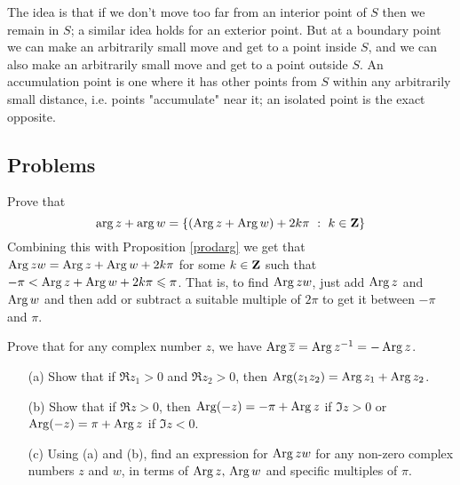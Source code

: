 
\begin{remark}
The idea is that if we don't move too far from an interior point of $S$ then we remain in $S$; a similar idea holds for an exterior point. But at a boundary point we can make an arbitrarily small move and get to a point inside $S$, and we can also make an arbitrarily small move and get to a point outside $S$. An accumulation point is one where it has other points from $S$ within any arbitrarily small distance, i.e. points "accumulate" near it; an isolated point is the exact opposite.
\end{remark}

\vspace*{2em}

\subsection{Problems}
\vspace*{0.1in}

\begin{problem}\label{prob 3.1}
Prove that 
\[\arg z + \arg w = \left\{(\operatorname{Arg} z + \operatorname{Arg} w) + 2k\pi\ :\ k \in \mathbf Z\right\}\]
Combining this with Proposition \ref{prodarg} we get that $\operatorname{Arg} zw = \operatorname{Arg} z + \operatorname{Arg} w + 2k\pi$ for some $k \in \mathbf Z$ such that $-\pi < \operatorname{Arg} z + \operatorname{Arg} w + 2k\pi \leqslant \pi$. That is, to find $\operatorname{Arg} zw$, just add $\operatorname{Arg} z$ and $\operatorname{Arg} w$ and then add or subtract a suitable multiple of $2\pi$ to get it between $-\pi$ and $\pi$.
\end{problem}

\vspace*{0.1in}

\begin{problem}\label{prob 3.2}
Prove that for any complex number $z$, we have $\operatorname{Arg} \overline{z} = \operatorname{Arg} z^{-1} = -\operatorname{Arg} z$.
\end{problem}

\vspace*{0.1in}

\begin{problem}\label{prob 3.3}\hfill
\begin{itemize}
\item[(a)] Show that if $\Re z_1 > 0$ and $\Re z_2 > 0$, then $\operatorname{Arg}(z_1z_2) = \operatorname{Arg} z_1 + \operatorname{Arg} z_2$.
\item[(b)] Show that if $\Re z > 0$, then $\operatorname{Arg}(-z) = -\pi + \operatorname{Arg} z$ if $\Im z > 0$ or $\operatorname{Arg}(-z) = \pi + \operatorname{Arg} z$ if $\Im z< 0$.
\item[(c)] Using (a) and (b), find an expression for $\operatorname{Arg} zw$ for any non-zero complex numbers $z$ and $w$, in terms of $\operatorname{Arg} z,\,\operatorname{Arg} w$ and specific multiples of $\pi$.
\end{itemize}
\end{problem}

